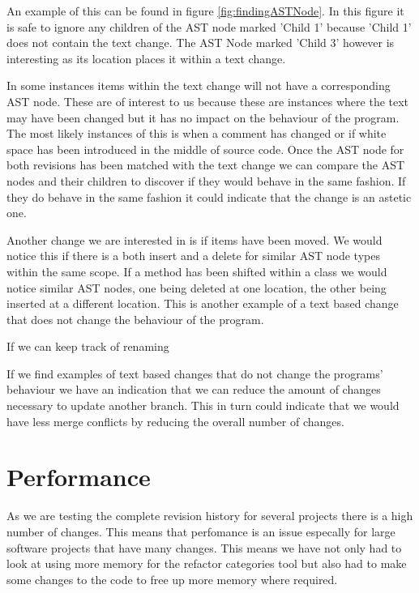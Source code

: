 An example of this can be found in figure \ref{fig:findingASTNode}.  In this figure it is safe to ignore any children of the AST node marked 'Child 1' because 'Child 1' does not contain the text change.  The AST Node marked 'Child 3' however is interesting as its location places it within a text change. 

In some instances items within the text change will not have a corresponding AST node.  These are of interest to us because these are instances where the text may have been changed but it has no impact on the behaviour of the program.  The most likely instances of this is when a comment has changed or if white space has been introduced in the middle of source code. Once the AST node for both revisions has been matched with the text change we can compare the AST nodes and their children to discover if they would behave in the same fashion. If they do behave in the same fashion it could indicate that the change is an astetic one.   

Another change we are interested in is if items have been moved.  We would notice this if there is a both insert and a delete for similar AST node types within the same scope.  If a method has been shifted within a class we would notice similar AST nodes, one being deleted at one location, the other being inserted at a different location.  This is another example of a text based change that does not change the behaviour of the program.

If we can keep track of renaming 

If we find examples of text based changes that do not change the programs' behaviour we have an indication that we can reduce the amount of changes necessary to update another branch. This in turn could indicate that we would have less merge conflicts by reducing the overall number of changes.

\section{Performance}
As we are testing the complete revision history for several projects there is a high number of changes.  This means that perfomance is an issue especally for large software projects that have many changes. This means we have not only had to look at using more memory for the refactor categories tool but also had to make some changes to the code to free up more memory where required.  

